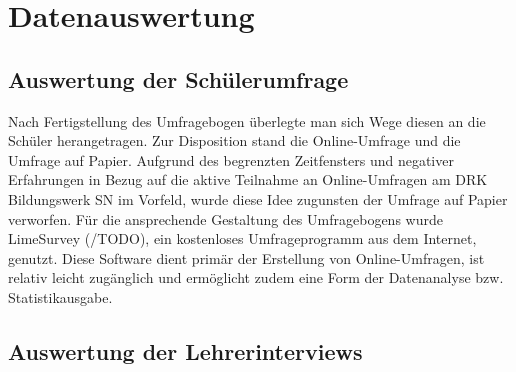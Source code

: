 \section{Datenauswertung}
\label{sec:Datenauswertung}

\subsection{Auswertung der Schülerumfrage}
\label{sec:AuswertungDerSchülerumfrage}

Nach Fertigstellung des Umfragebogen überlegte man sich Wege diesen an die Schüler herangetragen. Zur Disposition stand die Online-Umfrage und die Umfrage auf Papier. Aufgrund des begrenzten Zeitfensters und negativer Erfahrungen in Bezug auf die aktive Teilnahme an Online-Umfragen am DRK Bildungswerk SN im Vorfeld, wurde diese Idee zugunsten der Umfrage auf Papier verworfen. Für die ansprechende Gestaltung des Umfragebogens wurde LimeSurvey (/TODO), ein kostenloses Umfrageprogramm aus dem Internet, genutzt. Diese Software dient primär der Erstellung von Online-Umfragen, ist relativ leicht zugänglich und ermöglicht zudem eine Form der Datenanalyse bzw. Statistikausgabe.

\subsection{Auswertung der Lehrerinterviews}
\label{sec:AuswertungDerLehrerinterviews}




